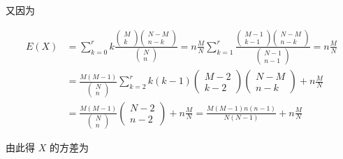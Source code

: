 又因为

\[
\begin{array}{ll}
{E(X)} & {=\sum_{k=0}^{r} k \frac{\left( \begin{array}{c}{M} \\
		{k}
		\end{array}
		\right) \left( 
		\begin{array}{c}
		{N-M} \\ 
		{n-k}
		\end{array}
		\right)}{\left( 
		\begin{array}{c}
		{N} \\ 
		{n}
		\end{array}
		\right)}=n \frac{M}{N} \sum_{k=1}^{r} \frac{\left( \begin{array}{c}
		{M-1} \\ 
		{k-1}
		\end{array}
		\right) \left( 
		\begin{array}{c}
		{N-M} \\ 
		{n-k}
		\end{array}
		\right)}{\left( 
		\begin{array}{c}
		{N-1} \\ 
		{n-1}
		\end{array}
		\right)}=n \frac{M}{N}} \\
{} & {=\frac{M(M-1)}{\left( 
		\begin{array}{l}{N} \\ 
		{n}
		\end{array}
		\right)} \sum_{k=2}^{r} k(k-1) \left( 
	\begin{array}{c}
	{M-2} \\ 
	{k-2}
	\end{array}
	\right) \left( 
	\begin{array}{c}{N-M} \\ 
	{n-k}
	\end{array}
	\right)+n \frac{M}{N}} \\
{} & {=\frac{M(M-1)}{\left( 
		\begin{array}{l}
		{N} \\ 
		{n}\end{array}
		\right)} \left( 
	\begin{array}{l}
	{N-2} \\ 
	{n-2}
	\end{array}
	\right)+n \frac{M}{N}=\frac{M(M-1) n(n-1)}{N(N-1)}+n \frac{M}{N}} 
\end{array}
\]

由此得 $ X $ 的方差为

